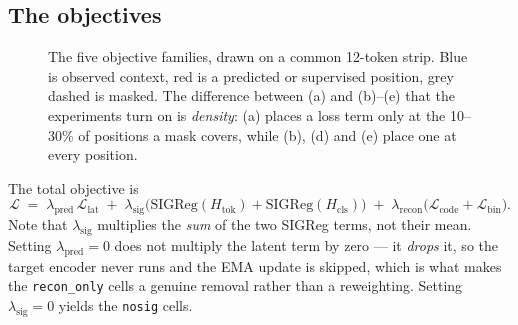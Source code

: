 \documentclass[11pt,a4paper]{article}
\newcommand{\code}[1]{\texttt{\small #1}}
\begin{document}
\subsection{The objectives}
\label{sec:objectives}

\begin{figure}[t]
\centering
\resizebox{0.98\textwidth}{!}{}
\caption{The five objective families, drawn on a common 12-token strip. Blue is
observed context, red is a predicted or supervised position, grey dashed is
masked. The difference between (a) and (b)--(e) that the experiments turn on is
\emph{density}: (a) places a loss term only at the 10--30\% of positions a mask
covers, while (b), (d) and (e) place one at every position.}
\label{fig:objectives}
\end{figure}

The total objective is
\begin{equation}
\mathcal{L} \;=\;
\lambda_{\mathrm{pred}}\,\mathcal{L}_{\mathrm{lat}}
\;+\;
\lambda_{\mathrm{sig}}
  \big(\mathrm{SIGReg}(H_{\mathrm{tok}}) + \mathrm{SIGReg}(H_{\mathrm{cls}})\big)
\;+\;
\lambda_{\mathrm{recon}}
  \big(\mathcal{L}_{\mathrm{code}} + \mathcal{L}_{\mathrm{bin}}\big).
\label{eq:total}
\end{equation}
Note that $\lambda_{\mathrm{sig}}$ multiplies the \emph{sum} of the two SIGReg
terms, not their mean. Setting $\lambda_{\mathrm{pred}} = 0$ does not multiply
the latent term by zero --- it \emph{drops} it, so the target encoder never runs
and the EMA update is skipped, which is what makes the \code{recon\_only} cells
a genuine removal rather than a reweighting. Setting
$\lambda_{\mathrm{sig}} = 0$ yields the \code{nosig} cells.
\end{document}
